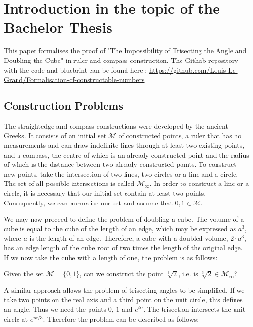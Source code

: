 \chapter[Introduction]{Introduction in the topic of the Bachelor Thesis}

This paper formalises the proof of "The Impossibility of Trisecting the Angle and Doubling the Cube" in ruler and compass construction. 
The Github repository with the code and bluebrint can be found here : \url{https://github.com/Louis-Le-Grand/Formalisation-of-constructable-numbers}
\section{Construction Problems}
The straightedge and compass constructions were developed by the ancient Greeks. 
It consists of an initial set $\mathcal{M}$ of constructed points, a ruler that has no measurements and can draw indefinite lines through at least two existing points,
and a compass, the centre of which is an already constructed point and the radius of which is the distance between two already constructed points. 
To construct new points, take the intersection of two lines, two circles or a line and a circle. The set of all possible intersections is called $\mathcal{M}_{\infty}$. 
In order to construct a line or a circle, it is necessary that our initial set contain at least two points. Consequently, we can normalise our set and assume that $0, 1 \in \mathcal{M}$.

We may now proceed to define the problem of doubling a cube. 
The volume of a cube is equal to the cube of the length of an edge, which may be expressed as $a^3$, where $a$ is the length of an edge. 
Therefore, a cube with a doubled volume, $2\cdot a^3$, has an edge length of the cube root of two times the length of the original edge. 
If we now take the cube with a length of one, the problem is as follows:
\begin{problem}
    Given the set $\mathcal{M} = \{0, 1\}$, can we construct the point $\sqrt[3]{2}$, i.e. is $\sqrt[3]{2} \in \mathcal{M}_{\infty}$?
\end{problem}

A similar approach allows the problem of trisecting angles to be simplified. 
If we take two points on the real axis and a third point on the unit circle, this defines an angle. Thus we need the points $0$, $1$ and $e^{i\alpha}$. 
The trisection intersects the unit circle at $e^{i\alpha/3}$. Therefore the problem can be described as follows:

